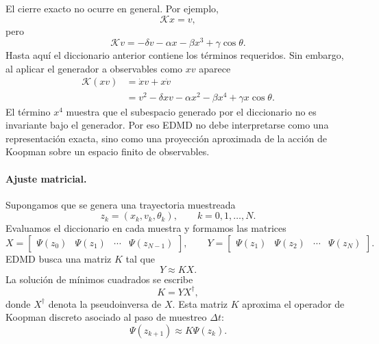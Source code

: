 El cierre exacto no ocurre en general. Por ejemplo,
\begin{equation}
\mathcal{K}x=v,
\label{eq:Koopman_duffing_Kx}
\end{equation}
pero
\begin{equation}
\mathcal{K}v=-\delta v-\alpha x-\beta x^3+\gamma\cos\theta.
\label{eq:Koopman_duffing_Kv}
\end{equation}
Hasta aquí el diccionario anterior contiene los términos requeridos. Sin embargo, al aplicar el generador a observables como \(xv\) aparece
\begin{align}
\mathcal{K}(xv)
&=\dot{x}v+x\dot{v}
\\
&=v^2-\delta xv-\alpha x^2-\beta x^4+\gamma x\cos\theta.
\label{eq:Koopman_duffing_Kxv}
\end{align}
El término \(x^4\) muestra que el subespacio generado por el diccionario no es invariante bajo el generador. Por eso EDMD no debe interpretarse como una representación exacta, sino como una proyección aproximada de la acción de Koopman sobre un espacio finito de observables.

\paragraph{Ajuste matricial.}
Supongamos que se genera una trayectoria muestreada
\begin{equation}
z_k=(x_k,v_k,\theta_k),
\qquad k=0,1,\ldots,N.
\end{equation}
Evaluamos el diccionario en cada muestra y formamos las matrices
\begin{equation}
X=
\begin{bmatrix}
\Psi(z_0) & \Psi(z_1) & \cdots & \Psi(z_{N-1})
\end{bmatrix},
\qquad
Y=
\begin{bmatrix}
\Psi(z_1) & \Psi(z_2) & \cdots & \Psi(z_N)
\end{bmatrix}.
\label{eq:Koopman_duffing_XY}
\end{equation}
EDMD busca una matriz \(K\) tal que
\begin{equation}
Y\approx KX.
\label{eq:Koopman_duffing_EDMD_fit}
\end{equation}
La solución de mínimos cuadrados se escribe
\begin{equation}
K=YX^{\dagger},
\label{eq:Koopman_duffing_K_matrix}
\end{equation}
donde \(X^{\dagger}\) denota la pseudoinversa de \(X\). Esta matriz \(K\) aproxima el operador de Koopman discreto asociado al paso de muestreo \(\Delta t\):
\begin{equation}
\Psi(z_{k+1})\approx K\Psi(z_k).
\label{eq:Koopman_duffing_discrete_evolution}
\end{equation}

